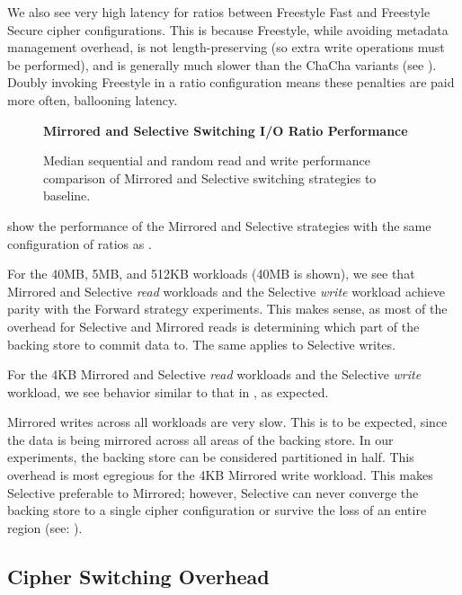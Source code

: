 We also see very high latency for ratios between Freestyle Fast and Freestyle
Secure cipher configurations. This is because Freestyle, while avoiding metadata
management overhead, is not length-preserving (so extra write operations must be
performed), and is generally much slower than the ChaCha variants (see
). Doubly invoking Freestyle in a ratio configuration
means these penalties are paid more often, ballooning latency.

\begin{figure}[ht]
  \textbf{Mirrored and Selective Switching I/O Ratio Performance}\par\medskip
  \centering
  {} \caption{Median sequential
  and random read and write performance comparison of Mirrored and Selective
  switching strategies to baseline.}
 \label{fig:mirrored-selective-baseline}
\end{figure}

 show the performance of the Mirrored and
Selective strategies with the same configuration of ratios as
.

For the 40MB, 5MB, and 512KB workloads (40MB is shown), we see that Mirrored and
Selective \emph{read} workloads and the Selective \emph{write} workload achieve
parity with the Forward strategy experiments. This makes sense, as most of the
overhead for Selective and Mirrored reads is determining which part of the
backing store to commit data to. The same applies to Selective writes.

For the 4KB Mirrored and Selective \emph{read} workloads and the Selective
\emph{write} workload, we see behavior similar to that in
, as expected.

Mirrored writes across all workloads are very slow. This is to be expected,
since the data is being mirrored across all areas of the backing store. In our
experiments, the backing store can be considered partitioned in half. This
overhead is most egregious for the 4KB Mirrored write workload. This makes
Selective preferable to Mirrored; however, Selective can never converge the
backing store to a single cipher configuration or survive the loss of an entire
region (see: ).

\subsection{Cipher Switching Overhead}\label{subsec:3}

